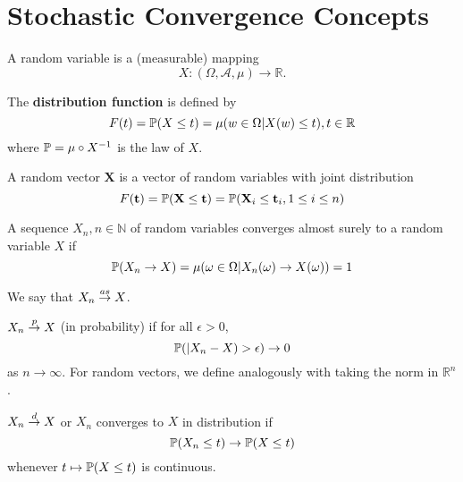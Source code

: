\chapter{Stochastic Convergence Concepts}
\label{cha:stoch-conv-conc}

\begin{defn}
  A random variable is a (measurable) mapping $$X: (\Omega, \mathcal{A},
  \mu) \rightarrow \mathbb{R}.$$

  The \textbf{distribution function} is defined by
  \begin{equation}
    \label{eq:7}
    F(t) = \Prob{X \leq t} = \mu(w \in \Omega | X(w) \leq t), t \in
  \mathbb{R}
  \end{equation}
  where $\Prob = \mu \circ X^{-1}$ is the law of $X$.

  A random vector $\mathbf{X}$ is a vector of random variables with joint
  distribution
  \begin{equation}
    \label{eq:8}
F(\mathbf{t}) = \Prob{\mathbf{X} \leq \mathbf{t}} = \Prob{\mathbf{X}_{i} \leq \mathbf{t}_{i}, 1 \leq i \leq n}
  \end{equation}
\end{defn}

\begin{defn}
A sequence $X_{n}, n \in \mathbb{N}$ of random variables converges
almost surely to a random variable $X$ if
\begin{equation}
  \label{eq:4}
  \Prob{X_{n} \rightarrow X} = \mu(\omega \in \Omega | X_{n}(\omega)
  \rightarrow X(\omega)) = 1
\end{equation}

We say that $X_{n} \overset{as}{\rightarrow} X$.
\end{defn}

\begin{defn}
$X_{n} \overset{p}{\rightarrow} X$ (in probability) if for all $\epsilon > 0$,
\begin{equation}
  \label{eq:5}
  \Prob{|X_{n} - X} > \epsilon) \rightarrow 0
\end{equation} as $n \rightarrow \infty$.
For random vectors, we define analogously with taking the norm in
$\mathbb{R}^{n}$. 
\end{defn}

\begin{defn}
$X_{n} \overset{d}{\rightarrow} X$ or $X_{n}$ converges to $X$ in distribution if
\begin{equation}
  \label{eq:6}
  \Prob{X_{n} \leq t} \rightarrow \Prob{X \leq t}
\end{equation} whenever $t \mapsto \Prob{X \leq t}$ is continuous.
\end{defn}


